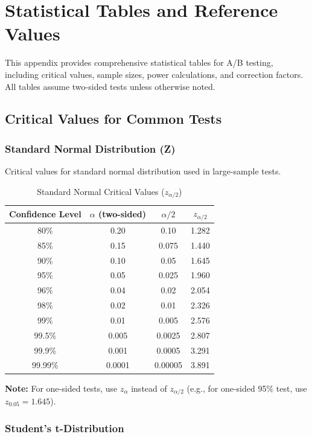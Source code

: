 \appendix
\chapter{Statistical Tables and Reference Values}

This appendix provides comprehensive statistical tables for A/B testing, including critical values, sample sizes, power calculations, and correction factors. All tables assume two-sided tests unless otherwise noted.

\section{Critical Values for Common Tests}

\subsection{Standard Normal Distribution (Z)}

Critical values for standard normal distribution used in large-sample tests.

\begin{table}[h]
\centering
\caption{Standard Normal Critical Values ($z_{\alpha/2}$)}
\begin{tabular}{cccc}
\toprule
\textbf{Confidence Level} & \textbf{$\alpha$ (two-sided)} & \textbf{$\alpha/2$} & \textbf{$z_{\alpha/2}$} \\
\midrule
80\% & 0.20 & 0.10 & 1.282 \\
85\% & 0.15 & 0.075 & 1.440 \\
90\% & 0.10 & 0.05 & 1.645 \\
95\% & 0.05 & 0.025 & 1.960 \\
96\% & 0.04 & 0.02 & 2.054 \\
98\% & 0.02 & 0.01 & 2.326 \\
99\% & 0.01 & 0.005 & 2.576 \\
99.5\% & 0.005 & 0.0025 & 2.807 \\
99.9\% & 0.001 & 0.0005 & 3.291 \\
99.99\% & 0.0001 & 0.00005 & 3.891 \\
\bottomrule
\end{tabular}
\end{table}

\textbf{Note:} For one-sided tests, use $z_\alpha$ instead of $z_{\alpha/2}$ (e.g., for one-sided 95\% test, use $z_{0.05} = 1.645$).

\subsection{Student's t-Distribution}

